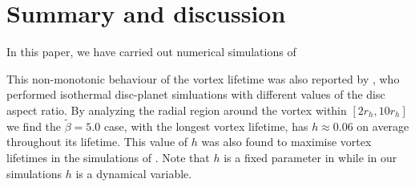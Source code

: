 \section{Summary and discussion}\label{summary}
In this paper, we have carried out numerical simulations of 








This non-monotonic behaviour of the vortex lifetime was also reported
by \cite{fu14}, who performed isothermal disc-planet 
simluations with different values of the disc aspect ratio.   
By analyzing the radial region around the vortex within $[2r_{h},10r_{h}]$
we find the 
$\tilde\beta=5.0$ case, with the longest vortex lifetime, has
$h\approx0.06$ on average throughout its lifetime. This value of $h$ was also
found to maximise vortex lifetimes in the simulations of
\cite{fu14}. Note that $h$ is a fixed parameter in \cite{fu14} while in
our simulations $h$ is a dynamical variable.  
